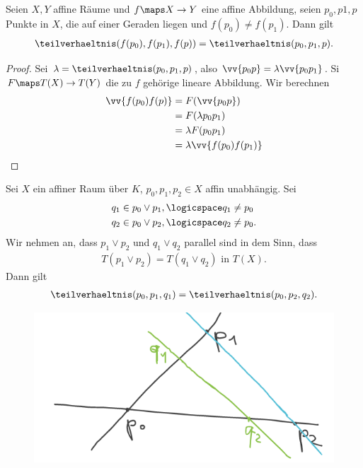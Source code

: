 \begin{lemma}\label{teilverhaeltnis_invariant_unter_affinen_abbildungen}
    Seien \( X,Y \) affine Räume und \( f\maps X\to Y \) eine affine Abbildung, seien \( p_0,p1,p \) Punkte in \( X \), die auf einer Geraden liegen und \( f(p_0)\neq f(p_1) \). Dann gilt
    \begin{align*}
        \teilverhaeltnis(f(p_0),f(p_1),f(p))=\teilverhaeltnis(p_0,p_1,p).
    \end{align*}
\end{lemma}
\begin{proof}
    Sei \( \lambda=\teilverhaeltnis(p_0,p_1,p) \), also \( \vv{p_0 p}=\lambda\vv{p_0 p_1} \). Si \( F\maps T(X)\to T(Y) \) die zu \( f \) gehörige lineare Abbildung. Wir berechnen
    \begin{align*}
        \vv{f(p_0) f(p)}\begin{aligned}[t]
            &=F(\vv{p_0 p})\\
            &=F(\lambda{p_0 p_1})\\
            &=\lambda F({p_0 p_1})\\
            &=\lambda \vv{f(p_0) f(p_1)}
        \end{aligned}
    \end{align*}
    
\end{proof}
\begin{anwendung*}[Strahlensatz]
    Sei \( X \) ein affiner Raum über \( K \), \( p_0,p_1,p_2\in X \) affin unabhängig. Sei
    \begin{align*}
        q_1&\in p_0\vee p_1,\logicspace q_1\neq p_0\\
        q_2&\in p_0\vee p_2,\logicspace q_2\neq p_0.
    \end{align*}
    Wir nehmen an, dass \( p_1\vee p_2 \) und \( q_1\vee q_2 \) parallel sind in dem Sinn, dass
    \begin{align*}
        T(p_1\vee p_2)=T(q_1\vee q_2)\text{ in }T(X).
    \end{align*}
    Dann gilt
    \begin{align*}
        \teilverhaeltnis(p_0,p_1,q_1)=\teilverhaeltnis(p_0,p_2,q_2).
    \end{align*}
    \begin{figure}[H]
        \centering
        \includegraphics[width=0.5\linewidth]{figures/Strahlensatz}
        \label{fig:Strahlensatz}
    \end{figure}
\end{anwendung*}
